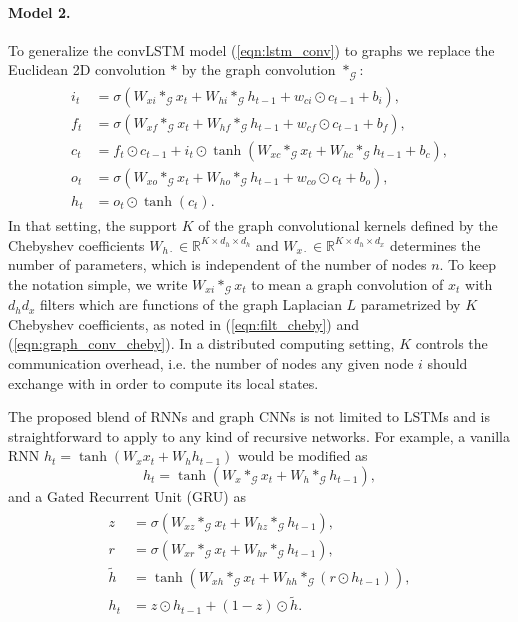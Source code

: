 \documentclass{article}
\newcommand{\R}{\mathbb{R}}
\newcommand{\G}{\mathcal{G}}
\newcommand{\eqnref}[1]{(\ref{eqn:#1})}
\begin{document}
\paragraph{Model 2.} To generalize the convLSTM model \eqnref{lstm_conv} to
graphs we replace the Euclidean 2D convolution $\ast$ by the graph convolution
$\ast_\G$:
\begin{align} \label{eqn:lstm_graph_v2}
\begin{split}
i_t &= \sigma(W_{xi} \ast_\G x_t + W_{hi} \ast_\G h_{t-1} +
w_{ci} \odot c_{t-1} + b_i), \\
f_t &= \sigma(W_{xf} \ast_\G x_t + W_{hf} \ast_\G h_{t-1} +
w_{cf} \odot c_{t-1} + b_f), \\
c_t &= f_t \odot c_{t-1} + i_t \odot
\tanh(W_{xc} \ast_\G x_t + W_{hc} \ast_\G h_{t-1} + b_c), \\
o_t &= \sigma(W_{xo} \ast_\G x_t + W_{ho} \ast_\G h_{t-1} +
w_{co} \odot c_t + b_o), \\
h_t &= o_t \odot \tanh(c_t).
\end{split}
\end{align}
In that setting, the support $K$ of the graph convolutional kernels defined by
the Chebyshev coefficients $W_{h\cdot} \in \R^{K \times d_h \times d_h}$ and
$W_{x\cdot} \in \R^{K \times d_h \times d_x}$ determines the number of
parameters, which is independent of the number of nodes $n$.  To keep the
notation simple, we write $W_{xi} \ast_\G x_t$ to mean a graph convolution of
$x_t$ with $d_h d_x$ filters which are functions of the graph Laplacian $L$
parametrized by $K$ Chebyshev coefficients, as noted in \eqnref{filt_cheby} and
\eqnref{graph_conv_cheby}. In a distributed computing setting, $K$ controls
the communication overhead, i.e. the number of nodes any given node $i$ should
exchange with in order to compute its local states.

The proposed blend of RNNs and graph CNNs is not limited to LSTMs and is
straightforward to apply to any kind of recursive networks. For example, a
vanilla RNN $h_t = \tanh(W_x x_{t} + W_h h_{t-1})$ would be modified as
\begin{equation} \label{eqn:vrnn_graph}
	h_t = \tanh(W_x \ast_\G x_t + W_h \ast_\G h_{t-1}),
\end{equation}
and a Gated Recurrent Unit (GRU) \citep{gru} as
\begin{align} \label{eqn:gru_graph}
\begin{split}
	z &= \sigma(W_{xz} \ast_\G x_t + W_{hz} \ast_\G h_{t-1}), \\
	r &= \sigma(W_{xr} \ast_\G x_t + W_{hr} \ast_\G h_{t-1}), \\
	\tilde{h} &= \tanh(W_{xh} \ast_\G x_t + W_{hh} \ast_\G (r \odot h_{t-1})), \\
	h_t &= z \odot h_{t-1} + (1-z) \odot \tilde{h}.
\end{split}
\end{align}
\end{document}
